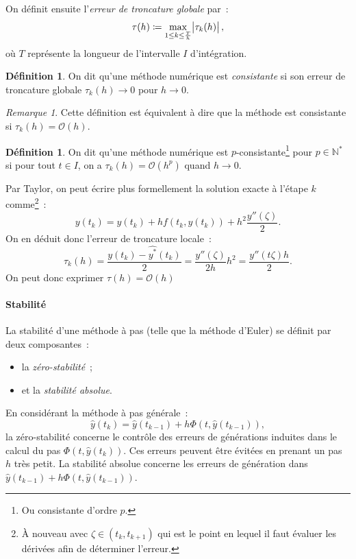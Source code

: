 \documentclass{article}
\theoremstyle{definition}
\newtheorem{déf}[thm]{Définition}
\theoremstyle{remark}
\newtheorem*{rmq}{Remarque}
\newcommand{\N}{\mathbb N}
\begin{document}
		On définit ensuite l'\emph{erreur de troncature globale} par~:
		\[\tau(h) \coloneqq \max_{1 \leq k \leq \frac Th}\abs{\tau_k(h)},\]
		où $T$ représente la longueur de l'intervalle $I$ d'intégration.

		\begin{déf} On dit qu'une méthode numérique est \emph{consistante} si son erreur de troncature globale $\tau_k(h) \to 0$ pour $h \to 0$. \end{déf}

		\begin{rmq} Cette définition est équivalent à dire que la méthode est consistante si $\tau_k(h) = \mathcal O(h)$. \end{rmq}

		\begin{déf} On dit qu'une méthode numérique est $p$-consistante\footnote{Ou consistante d'ordre $p$.} pour $p \in \N^*$ si pour tout $t \in I$, on a
		$\tau_k(h) = \mathcal O(h^p)$ quand $h \to 0$. \end{déf}

		Par Taylor, on peut écrire plus formellement la solution exacte à l'étape $k$ comme\footnote{À nouveau avec $\zeta \in (t_k, t_{k+1})$ qui est le point
		en lequel il faut évaluer les dérivées afin de déterminer l'erreur.}~:
		\[y(t_k) = y(t_k) + hf(t_k, y(t_k)) + h^2\frac {y''(\zeta)}2.\]
		On en déduit donc l'erreur de troncature locale~:
		\[\tau_k(h) = \frac {y(t_k) - \widehat {y^*}(t_k)}2 = \frac {y''(\zeta)}{2h}h^2 = \frac {y''(t\zeta)h}2.\]
		On peut donc exprimer $\tau(h) = \mathcal O(h)$

		\paragraph{Stabilité} La stabilité d'une méthode à pas (telle que la méthode d'Euler) se définit par deux composantes~:
		\begin{itemize}
			\item la \emph{zéro-stabilité}~;
			\item et la \emph{stabilité absolue}.
		\end{itemize}

		En considérant la méthode à pas générale~:
		\[\widehat y(t_k) = \widehat y(t_{k-1}) + h\Phi(t, \widehat y(t_{k-1})),\]
		la zéro-stabilité concerne le contrôle des erreurs de générations induites dans le calcul du pas $\Phi(t, \widehat y(t_k))$. Ces erreurs peuvent être
		évitées en prenant un pas $h$ très petit. La stabilité absolue concerne les erreurs de génération dans
		$\widehat y(t_{k-1}) + h\Phi(t, \widehat y(t_{k-1}))$.
\end{document}
